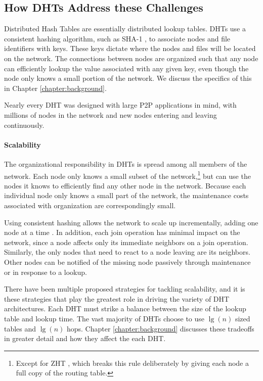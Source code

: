 \subsection{How DHTs Address these Challenges}
Distributed Hash Tables are essentially distributed lookup tables.
DHTs use a consistent hashing algorithm, such as SHA-1 \cite{sha1}, to associate nodes and file identifiers with keys.  
These keys dictate where the nodes and files will be located on the network.
The connections between nodes are organized such that any node can efficiently lookup the value associated with any given key, even though the node only knows a small portion of the network.
We discuss the specifics of this in Chapter \ref{chapter:background}.

Nearly every DHT was designed with large P2P applications in mind, with millions of nodes in the network and new nodes entering and leaving continuously.

\paragraph{Scalability}
The organizational responsibility in DHTs is spread among all members of the network.
Each node only knows a small subset of the network,\footnote{Except for ZHT \cite{li2013zht}, which breaks this rule deliberately by giving each node a full copy of the routing table.} but can use the nodes it knows to efficiently find any other node in the network.
Because each individual node only knows a small part of the network, the maintenance costs associated with organization are correspondingly small.

Using consistent hashing allows the network to scale up incrementally, adding one node at a time \cite{dynamo}.
In addition, each join operation has minimal impact on the network, since a node affects only its immediate neighbors on a join operation.
Similarly, the only nodes that need to react to a node leaving are its neighbors.
Other nodes can be notified of the missing node passively through maintenance or in response to a lookup.

There have been multiple proposed strategies for tackling scalability, and it is these strategies that play the greatest role in driving the variety of DHT architectures. 
Each DHT must strike a balance between the size of the lookup table and lookup time. 
The vast majority of DHTs choose to use $\lg(n)$ sized tables and  $\lg(n)$ hops. 
Chapter \ref{chapter:background} discusses these tradeoffs in greater detail and how they affect the each DHT.


